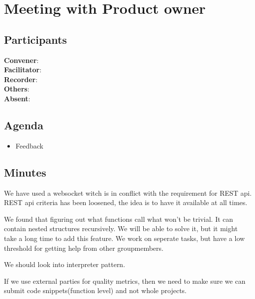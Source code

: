 \section*{Meeting with Product owner}

\subsection*{Participants}
\textbf{Convener}: \productowner{}      \\
\textbf{Facilitator}: \facilitator{}    \\
\textbf{Recorder}: \scrummaster{}       \\
\textbf{Others}: \groupleader{}         \\
\textbf{Absent}: 

\subsection*{Agenda}
\begin{itemize}
    \item Feedback
\end{itemize}

\subsection*{Minutes}
We have used a websocket witch is in conflict with the requirement for REST api.
REST api criteria has been loosened, the idea is to have it available at all times.

We found that figuring out what functions call what won't be trivial. It can contain nested structures recursively. We will be able to solve it, but it might take a long time to add this feature. We work on seperate tasks, but have a low threshold for getting help from other groupmembers. 

We should look into interpreter pattern. 

If we use external parties for quality metrics, then we need to make sure we can submit code snippets(function level) and not whole projects. 
\newpage